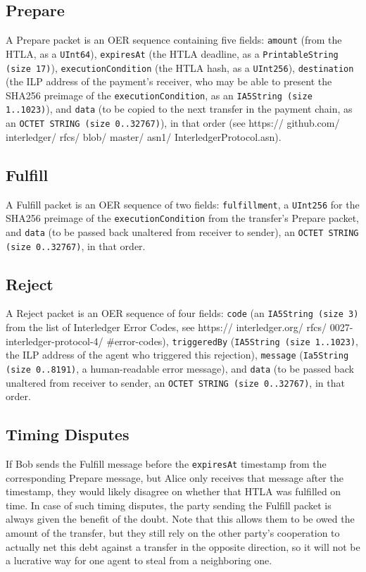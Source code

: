 \documentclass[11pt,twoside,a4paper]{article}
\begin{document}
\subsection{Prepare}
A Prepare packet is an OER sequence containing five fields:
{\tt amount} (from the HTLA, as a {\tt UInt64}),
{\tt expiresAt} (the HTLA deadline, as a {\tt PrintableString (size 17)}),
{\tt executionCondition} (the HTLA hash, as a {\tt UInt256}),
{\tt destination} (the ILP address of the payment's receiver, who may be able to present the SHA256 preimage of the {\tt executionCondition}, as an {\tt IA5String (size 1..1023)}), and
{\tt data} (to be copied to the next transfer in the payment chain, as an {\tt OCTET STRING (size 0..32767)}),
in that order (see https:// github.com/ interledger/ rfcs/ blob/ master/ asn1/ InterledgerProtocol.asn).

\subsection{Fulfill}
A Fulfill packet is an OER sequence of two fields:
{\tt fulfillment}, a {\tt UInt256} for the SHA256 preimage of the {\tt executionCondition} from the transfer's Prepare packet,
and {\tt data} (to be passed back unaltered from receiver to sender), an {\tt OCTET STRING (size 0..32767)}, in that order.

\subsection{Reject}
A Reject packet is an OER sequence of four fields:
{\tt code} (an {\tt IA5String (size 3)} from the list of Interledger Error Codes, see https:// interledger.org/ rfcs/ 0027-interledger-protocol-4/ \#error-codes),
{\tt triggeredBy} ({\tt IA5String (size 1..1023)}, the ILP address of the agent who triggered this rejection),
{\tt message} ({\tt Ia5String (size 0..8191)}, a human-readable error message),
and {\tt data} (to be passed back unaltered from receiver to sender, an {\tt OCTET STRING (size 0..32767)}, in that order.

\subsection{Timing Disputes}
If Bob sends the Fulfill message before the {\tt expiresAt} timestamp from the corresponding Prepare message, but Alice only receives that message after the
timestamp, they would likely disagree on whether that HTLA was fulfilled on time. In case of such timing disputes, the party sending the Fulfill
packet is always given the benefit of the doubt. Note that this allows them to be owed the amount of the transfer, but they still rely on the other party's
cooperation to actually net this debt against a transfer in the opposite direction, so it will not be a lucrative way for one agent to steal from a neighboring one.
\end{document}
